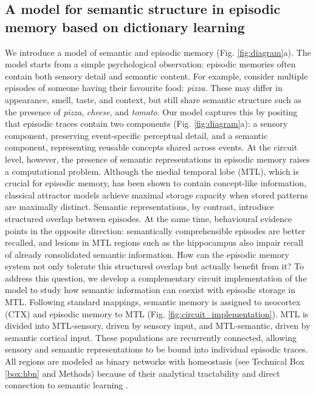 \documentclass{article}
\begin{document}
\subsection*{A model for semantic structure in episodic memory based on dictionary learning}
We introduce a model of semantic and episodic memory (Fig. \ref{fig:diagram}a). The model starts from a simple psychological observation: episodic memories often contain both sensory detail and semantic content. For example, consider multiple episodes of someone having their favourite food: \textit{pizza}. These may differ in appearance, smell, taste, and context, but still share semantic structure such as the presence of \textit{pizza}, \textit{cheese}, and \textit{tomato}. Our model captures this by positing that episodic traces contain two components (Fig. \ref{fig:diagram}a): a sensory component, preserving event-specific perceptual detail, and a semantic component, representing reusable concepts shared across events.
\newline\newline
At the circuit level, however, the presence of semantic representations in episodic memory raises a computational problem. Although the medial temporal lobe (MTL), which is crucial for episodic memory, has been shown to contain concept-like information, classical attractor models achieve maximal storage capacity when stored patterns are maximally distinct. Semantic representations, by contrast, introduce structured overlap between episodes. At the same time, behavioural evidence points in the opposite direction: semantically comprehensible episodes are better recalled, and lesions in MTL regions such as the hippocampus also impair recall of already consolidated semantic information. How can the episodic memory system not only tolerate this structured overlap but actually benefit from it? To address this question, we develop a complementary circuit implementation of the model to study how semantic information can coexist with episodic storage in MTL. Following standard mappings, semantic memory is assigned to neocortex (CTX) and episodic memory to MTL (Fig. \ref{fig:circuit_implementation}). MTL is divided into MTL-sensory, driven by sensory input, and MTL-semantic, driven by semantic cortical input. These populations are recurrently connected, allowing sensory and semantic representations to be bound into individual episodic traces. All regions are modeled as binary networks with homeostasis (see Technical Box \ref{box:hbn} and Methods) because of their analytical tractability and direct connection to semantic learning .
\end{document}

